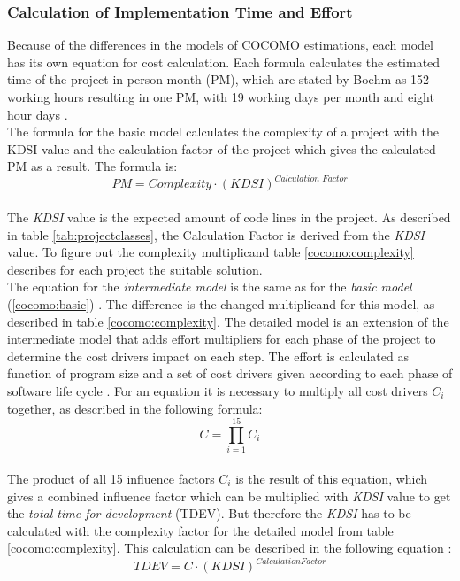 \subsubsection{Calculation of Implementation Time and Effort}

Because of the differences in the models of COCOMO estimations, each model has its own equation for cost calculation. Each formula calculates the estimated time of the project in person month (PM), which are stated by Boehm as 152 working hours resulting in one PM, with 19 working days per month and eight hour days \cite{boehm}. \\
The formula for the basic model calculates the complexity of a project with the KDSI value and the calculation factor of the project which gives the calculated PM as a result. The formula is:\\
\begin{equation}
\textit{PM} = \textit{Complexity} \cdot (\textit{KDSI})^{\textit{Calculation Factor}} \label{cocomo:basic}
\end{equation}\\
The \textit{KDSI} value is the expected amount of code lines in the project. As described in table \ref{tab:projectclasses}, the Calculation Factor is derived from the \textit{KDSI} value. To figure out the complexity multiplicand table \ref{cocomo:complexity} describes for each project the suitable solution.\\
The equation for the \textit{intermediate model} is the same as for the \textit{basic model} (\ref{cocomo:basic}) \cite{boehm}. The difference is the changed multiplicand for this model, as described in table \ref{cocomo:complexity}. The detailed model is an extension of the intermediate model that adds effort multipliers for each phase of the project to determine the cost drivers impact on each step. The effort is calculated as function of program size and a set of cost drivers given according to each phase of software life cycle \cite{boehm}. For an equation it is necessary to multiply all cost drivers \textbf{\(C_i\)} together, as described in the following formula:\\
\begin{equation}
C = \prod \limits_{i=1}^{15} C_i \label{cocomo:detailedcostdrivers}
\end{equation}\\
The product of all 15 influence factors $C_i$ is the result of this equation, which 
gives a combined influence factor which can be multiplied with \textit{KDSI} value to get the \textit{total time for development} (TDEV). But therefore the \textit{KDSI} has to be calculated with the complexity factor for the detailed model from table \ref{cocomo:complexity}. This calculation can be described in the following equation \cite{boehm}:\\
\begin{equation}
TDEV = C \cdot (KDSI)^{Calculation Factor} \label{cocomo:detailed}
\end{equation}\\


